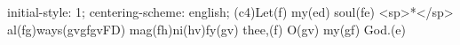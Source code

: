 initial-style: 1;
centering-scheme: english;
(c4)Let(f) my(ed) soul(fe) <sp>*</sp> al(fg)ways(gvgfgvFD) mag(fh)ni(hv)fy(gv) thee,(f) O(gv) my(gf) God.(e)